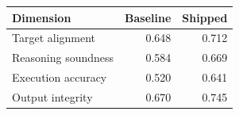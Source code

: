 \begin{tabular}{lrr}
\toprule
Dimension & Baseline & Shipped \\
\midrule
Target alignment & 0.648 & 0.712 \\
Reasoning soundness & 0.584 & 0.669 \\
Execution accuracy & 0.520 & 0.641 \\
Output integrity & 0.670 & 0.745 \\
\bottomrule
\end{tabular}
